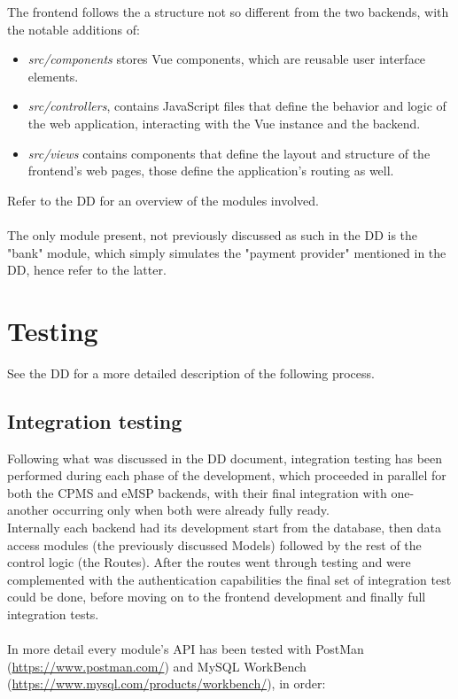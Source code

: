 \documentclass[11pt]{article}
\begin{document}
The frontend follows the a structure not so different from the two backends, with the notable additions of:
\begin{itemize}
    \item \textit{src/components} stores Vue components, which are reusable user interface elements.
    \item \textit{src/controllers}, contains JavaScript files that define the behavior and logic of the web application, interacting with the Vue instance and the backend.
    \item \textit{src/views} contains components that define the layout and structure of the frontend's web pages, those define the application's routing as well.
\end{itemize}

Refer to the DD for an overview of the modules involved.\\
\\
The only module present, not previously discussed as such in the DD is the "bank" module, which simply simulates the "payment provider" mentioned in the DD, hence refer to the latter.

\newpage

\section{Testing}

See the DD for a more detailed description of the following process.

\subsection{Integration testing}

Following what was discussed in the DD document, integration testing has been performed during each phase of the development, which proceeded in parallel for both the CPMS and eMSP backends, with their final integration with one-another occurring only when both were already fully ready. \\
Internally each backend had its development start from the database, then data access modules (the previously discussed Models) followed by the rest of the control logic (the Routes). After the routes went through testing and were complemented with the authentication capabilities the final set of integration test could be done, before moving on to the frontend development and finally full integration tests. \\
\\
In more detail every module's API has been tested with PostMan (\href{https://www.postman.com/}{https://www.postman.com/}) and MySQL WorkBench (\href{https://www.mysql.com/products/workbench/}{https://www.mysql.com/products/workbench/}), in order:
\end{document}
